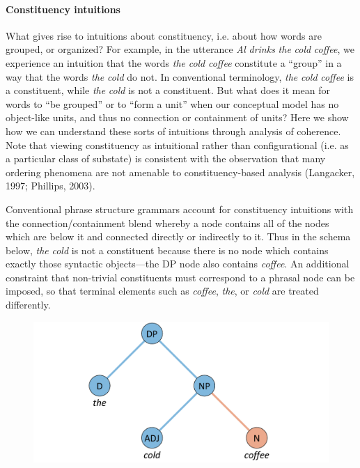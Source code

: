\paragraph{Constituency intuitions}

What gives rise to intuitions about constituency, i.e. about how words are grouped, or organized? For example, in the utterance \textit{Al} \textit{drinks} \textit{the} \textit{cold} \textit{coffee}, we experience an intuition that the words \textit{the} \textit{cold} \textit{coffee} constitute a “group” in a way that the words \textit{the} \textit{cold} do not. In conventional terminology, \textit{the} \textit{cold} \textit{coffee} is a constituent, while \textit{the} \textit{cold} is not a constituent. But what does it mean for words to “be grouped” or to “form a unit” when our conceptual model has no object-like units, and thus no connection or containment of units? Here we show how we can understand these sorts of intuitions through analysis of coherence. Note that viewing constituency as intuitional rather than configurational (i.e. as a particular class of substate) is consistent with the observation that many ordering phenomena are not amenable to constituency-based analysis (Langacker, 1997; Phillips, 2003).

  Conventional phrase structure grammars account for constituency intuitions with the connection/containment blend whereby a node contains all of the nodes which are below it and connected directly or indirectly to it. Thus in the schema below, \textit{the} \textit{cold} is not a constituent because there is no node which contains exactly those syntactic objects—the DP node also contains \textit{coffee}. An additional constraint that non-trivial constituents must correspond to a phrasal node can be imposed, so that terminal elements such as \textit{coffee}, \textit{the}, or \textit{cold} are treated differently. 

  
\begin{figure}
\includegraphics[width=\textwidth]{figures/Tilsen-img136.png}
\caption{\missingcaption}
\label{fig:}
\end{figure}
 

